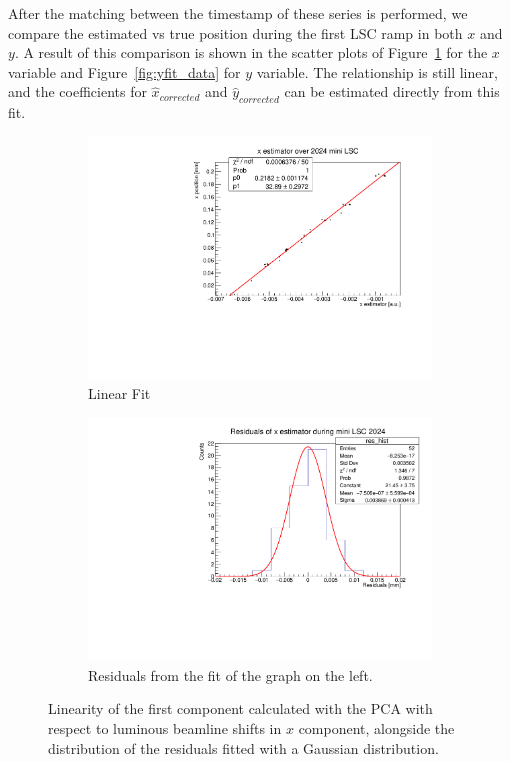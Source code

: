 After the matching between the timestamp of these series is performed, we compare the estimated vs true position during the first LSC ramp in both $x$ and $y$. A result of this comparison is shown in the scatter plots of Figure~\ref{fig:xfit_data} for the $x$ variable and Figure~\ref{fig:yfit_data} for $y$ variable. The relationship is still linear, and the coefficients for $\hat{x}_{corrected}$ and $\hat{y}_{corrected}$ can be estimated directly from this fit.

\begin{figure}
    \centering
    \begin{subfigure}{0.48\textwidth}
    \includegraphics[width=\linewidth]{figures/x_res_new.pdf}
    \caption{Linear Fit}\label{fig:xfit_data}
    \end{subfigure}
    \begin{subfigure}{0.48\textwidth}
    \includegraphics[width=\linewidth]{figures/x_fit_new.pdf}
    \caption{Residuals from the fit of the graph on the left. }\label{fig:xres_data}
    \end{subfigure}
    \caption{Linearity of the first component calculated with the PCA with respect to luminous beamline shifts in $x$ component, alongside the distribution of the residuals fitted with a Gaussian distribution.}
    \label{fig:x_data}
\end{figure}


